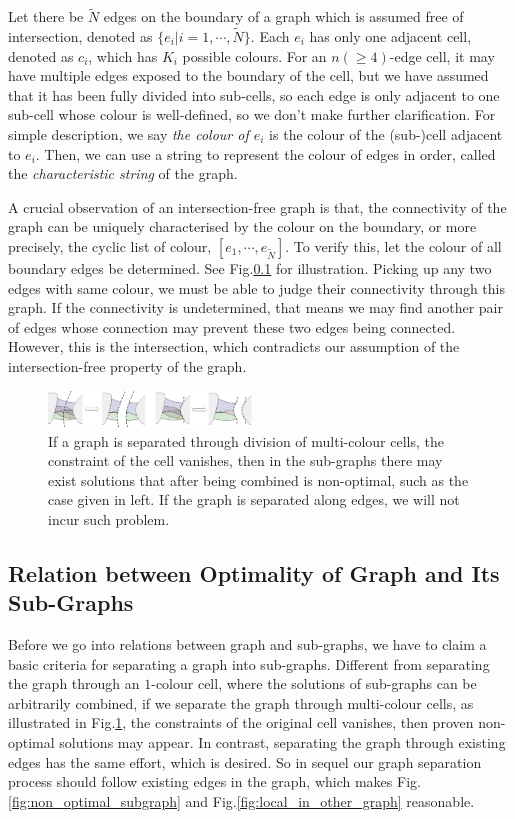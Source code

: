 \documentclass[conference]{IEEEtran}
\begin{document}
Let there be $\tilde{N}$ edges on the boundary of a graph which is assumed free of intersection, denoted as $\{e_i|i = 1, \cdots, \tilde{N}\}$. Each $e_i$ has only one adjacent cell, denoted as $c_i$, which has $K_i$ possible colours. 
For an $n(\geq 4)$-edge cell, it may have multiple edges exposed to the boundary of the cell, but we have assumed that it has been fully divided into sub-cells, so each edge is only adjacent to one sub-cell whose colour is well-defined, so we don't make further clarification.  
For simple description, we say \textit{the colour of $e_i$} is the colour of the (sub-)cell adjacent to $e_i$.  
Then, we can use a string to represent the colour of edges in order, called the \textit{characteristic string} of the graph. 

A crucial observation of an intersection-free graph is that, the connectivity of the graph can be uniquely characterised by the colour on the boundary, or more precisely, the cyclic list of colour, $[e_1, \cdots, e_{\tilde{N}}]$. 
To verify this, let the colour of all boundary edges be determined. See Fig.\ref{} for illustration. Picking up any two edges with same colour, we must be able to judge their connectivity through this graph. If the connectivity is undetermined, that means we may find another pair of edges whose connection may prevent these two edges being connected. However, this is the intersection, which contradicts our assumption of the intersection-free property of the graph. 

\begin{figure}[t]
\centering
\includegraphics[width=0.48\textwidth]{figures/separation_at_edges_2}
\caption{If a graph is separated through division of multi-colour cells, the constraint of the cell vanishes, then in the sub-graphs there may exist solutions that after being combined is non-optimal, such as the case given in left. If the graph is separated along edges, we will not incur such problem. }\label{fig:separation_at_edges}
\end{figure}


\subsection{Relation between Optimality of Graph and Its Sub-Graphs}
Before we go into relations between graph and sub-graphs, we have to claim a basic criteria for separating a graph into sub-graphs. 
Different from separating the graph through an $1$-colour cell, where the solutions of sub-graphs can be arbitrarily combined, if we separate the graph through multi-colour cells, as illustrated in Fig.\ref{fig:separation_at_edges}, the constraints of the original cell vanishes, then proven non-optimal solutions may appear. In contrast, separating the graph through existing edges has the same effort, which is desired. 
So in sequel our graph separation process should  follow existing edges in the graph, which makes Fig.\ref{fig:non_optimal_subgraph} and Fig.\ref{fig:local_in_other_graph} reasonable. 
\end{document}
